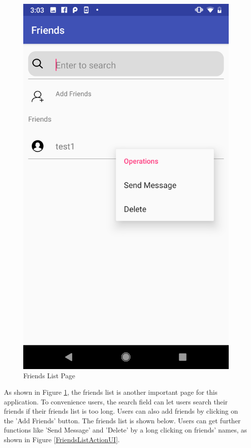 \begin{figure}[H]
\begin{minipage}[t]{0.4\textwidth}
\includegraphics[width=.95\textwidth]{section03/assets/FriendsListAction.png}
\subcaption{\label{FriendsListActionUI}}
\end{minipage}%
\caption[Friends List Page]{\label{WholeFriendsListUI}Friends List Page}
\end{figure}

\par As shown in Figure \ref{WholeFriendsListUI}, the friends list is another important page for this application. To convenience users, the search field can let users search their friends if their friends list is too long. Users can also add friends by clicking on the 'Add Friends' button. The friends list is shown below. Users can get further functions like 'Send Message' and 'Delete' by a long clicking on friends' names, as shown in Figure \ref{FriendsListActionUI}. 

